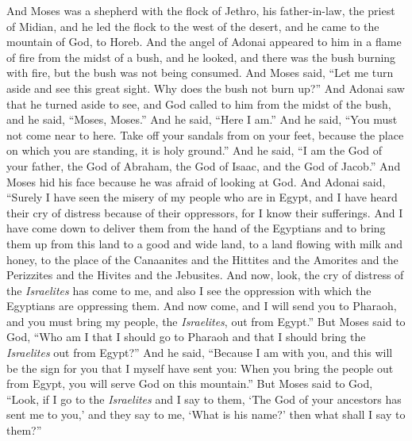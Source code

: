 \begin{biblechapter} %
 And Moses was a shepherd with the flock of Jethro, his father-in-law, the priest of Midian, and he led the flock to the west of the desert, and he came to the mountain of God, to Horeb.
\verse And the angel of Adonai appeared to him in a flame of fire from the midst of a bush, and he looked, and there was the bush burning with fire, but the bush was not being consumed.
\verse And Moses said, “Let me turn aside and see this great sight. Why does the bush not burn up?”
\verse And Adonai saw that he turned aside to see, and God called to him from the midst of the bush, and he said, “Moses, Moses.” And he said, “Here I am.”
\verse And he said, “You must not come near to here. Take off your sandals from on your feet, because the place on which you are standing, it is holy ground.”
\verse And he said, “I am the God of your father, the God of Abraham, the God of Isaac, and the God of Jacob.” And Moses hid his face because he was afraid of looking at God.
\verse And Adonai said, “Surely I have seen the misery of my people who are in Egypt, and I have heard their cry of distress because of their oppressors, for I know their sufferings.
\verse And I have come down to deliver them from the hand of the Egyptians and to bring them up from this land to a good and wide land, to a land flowing with milk and honey, to the place of the Canaanites and the Hittites and the Amorites and the Perizzites and the Hivites and the Jebusites.
\verse And now, look, the cry of distress of the \textit{Israelites} has come to me, and also I see the oppression with which the Egyptians are oppressing them.
\verse And now come, and I will send you to Pharaoh, and you must bring my people, the \textit{Israelites}, out from Egypt.”
\verse But Moses said to God, “Who am I that I should go to Pharaoh and that I should bring the \textit{Israelites} out from Egypt?”
\verse And he said, “Because I am with you, and this will be the sign for you that I myself have sent you: When you bring the people out from Egypt, you will serve God on this mountain.”
\verse But Moses said to God, “Look, if I go to the \textit{Israelites} and I say to them, ‘The God of your ancestors has sent me to you,’ and they say to me, ‘What is his name?’ then what shall I say to them?”

\end{biblechapter}
